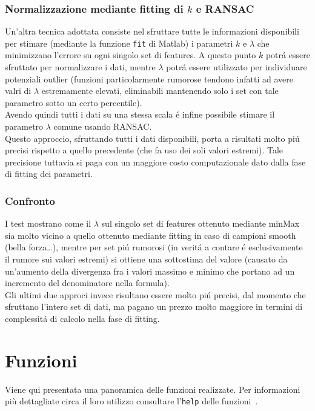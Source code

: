 \documentclass[12pt]{report}
\begin{document}
\subsection{Normalizzazione mediante fitting di $k$ e RANSAC}
\noindent Un'altra tecnica adottata consiste nel sfruttare tutte le informazioni disponibili  per stimare (mediante la funzione \verb|fit| di Matlab) i parametri $k$ e $\lambda$ che minimizzano l'errore su ogni singolo set di features. A questo punto $k$ potr\'a essere sfruttato per normalizzare i dati, mentre $\lambda$ potr\'a essere utilizzato per individuare potenziali outlier (funzioni particolarmente rumorose tendono infatti ad avere valri di $\lambda$ estremamente elevati, eliminabili mantenendo solo i set con tale parametro sotto un certo percentile).\\
Avendo quindi tutti i dati su una stessa scala \'e infine possibile stimare il parametro $\lambda$ comune usando RANSAC.\\
Questo approccio, sfruttando tutti i dati disponibili, porta a risultati molto pi\'u precisi rispetto a quello precedente (che fa uso dei soli valori estremi). Tale precisione tuttavia si paga con un maggiore costo computazionale dato dalla fase di fitting dei parametri.

\subsection{Confronto}
\noindent I test mostrano come il $\lambda$ sul singolo set di features ottenuto mediante minMax sia molto vicino a quello ottenuto mediante fitting in caso di campioni smooth (bella forza\dots), mentre per set pi\'u rumorosi (in verit\'a a contare \'e esclusivamente il rumore sui valori estremi) si ottiene una sottostima del valore (causato da un'aumento della divergenza fra i valori massimo e minimo che portano ad un incremento del denominatore nella formula).\\
Gli ultimi due approci invece risultano essere molto pi\'u precisi, dal momento che sfruttano l'intero set di dati, ma pagano un prezzo molto maggiore in termini di complessit\'a di calcolo nella fase di fitting.





\chapter{Funzioni}

Viene qui presentata una panoramica delle funzioni realizzate. Per informazioni pi\`u dettagliate circa il loro utilizzo consultare l'\verb|help| delle funzioni~\cite{lucaskanade81}.
\end{document}
